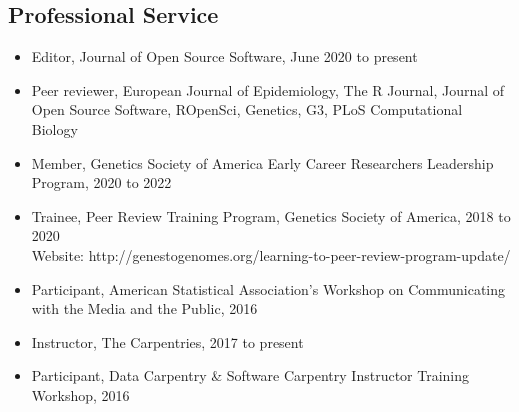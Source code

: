 \subsection*{Professional Service}
\begin{itemize}
\item Editor, Journal of Open Source Software, June 2020 to present
\item Peer reviewer, European Journal of Epidemiology, The R Journal, Journal of Open Source Software, ROpenSci, Genetics, G3, PLoS Computational Biology  
\item Member, Genetics Society of America Early Career Researchers Leadership Program, 2020 to 2022
\item Trainee, Peer Review Training Program, Genetics Society of America, 2018 to 2020 \\
Website: http://genestogenomes.org/learning-to-peer-review-program-update/
\item Participant, American Statistical Association's Workshop on Communicating with the Media and the Public, 2016 %
\item Instructor, The Carpentries, 2017 to present %
\item Participant, Data Carpentry \& Software Carpentry Instructor Training Workshop, 2016 %
\end{itemize}

